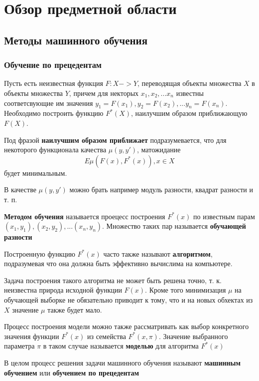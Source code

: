 \newpage
\section{Обзор предметной области}
\label{review}

\subsection{Методы машинного обучения} 
\label{ML}
\subsubsection{Обучение по прецедентам}
Пусть есть неизвестная функция $F: X -> Y$, переводящая объекты
множества $X$ в объекты множества $Y$, причем для некторых $x_1, x_2, ... x_n$ известны соответсвующие им значения $y_1 = F(x_1), y_2 = F(x_2), ... y_n = F(x_n)$.
Необходимо построить функцию $F^*(X)$, наилучшим образом приближающую $F(X)$.

Под фразой \textbf{наилучшим образом приближает} подразумевается, что для некоторого функционала качества $\mu(y, y')$, матожидание
\begin{equation}
\label{matozh}
E\mu(F(x), F^*(x)), x \in X
\end{equation}
будет минимальным.

В качестве $\mu(y, y')$ можно брать например модуль разности, квадрат разности и т. п.

\textbf{Методом обучения} называется проецесс построения $F^*(x)$ по известным парам $(x_1, y_1), (x_2, y_2), ... (x_n, y_n)$. Множество таких пар называется \textbf{обучающей разности}

Построенную функцию $F^*(x)$ часто также называют \textbf{алгоритмом}, подразумевая что она должна быть эффективно вычислима на компьютере.

Задача построения такого алгоритма не может быть решена точно, т. к. неизвестна природа исходной функции $F(x)$. Кроме того минимизация $\mu$ на обучающей выборке не обязательно приводит к тому, что и на новых обхектах из $X$ значение $\mu$ также будет мало.

Процесс построения модели можно также рассматривать как выбор конкретного значения функции $F^*(x)$ из семейства $F^*(x, \pi)$. Значение выбранного параметра $\pi$ в таком случае называется \textbf{моделью} для алгоритма
$F^*(x)$

В целом процесс решения задачи машинного обучения называют \textbf{машинным обучением} или \textbf{обучением по прецедентам}

